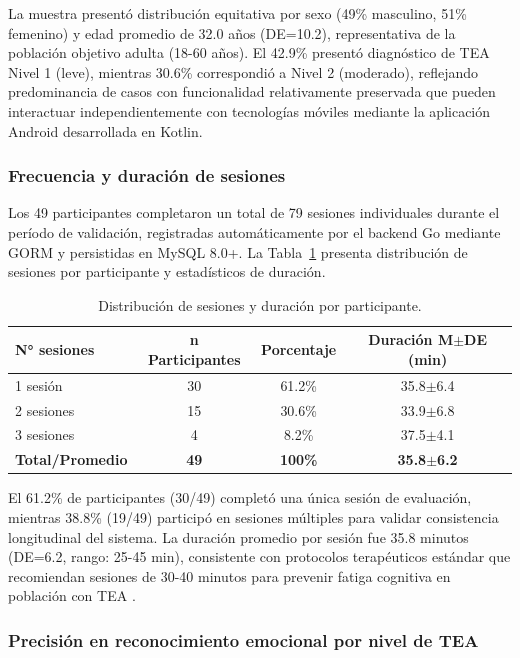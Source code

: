 \documentclass[journal,article,submit,pdftex,moreauthors]{Definitions/mdpi}
\begin{document}
	La muestra presentó distribución equitativa por sexo (49\% masculino, 51\% femenino) y edad promedio de 32.0 años (DE=10.2), representativa de la población objetivo adulta (18-60 años). El 42.9\% presentó diagnóstico de TEA Nivel 1 (leve), mientras 30.6\% correspondió a Nivel 2 (moderado), reflejando predominancia de casos con funcionalidad relativamente preservada que pueden interactuar independientemente con tecnologías móviles mediante la aplicación Android desarrollada en Kotlin.
	
	\subsubsection{Frecuencia y duración de sesiones}
	
	Los 49 participantes completaron un total de 79 sesiones individuales durante el período de validación, registradas automáticamente por el backend Go mediante GORM y persistidas en MySQL 8.0+. La Tabla~\ref{tab6} presenta distribución de sesiones por participante y estadísticos de duración.
	
	\begin{table}[H]
		\caption{Distribución de sesiones y duración por participante.\label{tab6}}
		\begin{tabularx}{\textwidth}{lccc}
			\toprule
			\textbf{N° sesiones} & \textbf{n Participantes} & \textbf{Porcentaje} & \textbf{Duración M$\pm$DE (min)} \\
			\midrule
			1 sesión & 30 & 61.2\% & 35.8$\pm$6.4 \\
			2 sesiones & 15 & 30.6\% & 33.9$\pm$6.8 \\
			3 sesiones & 4 & 8.2\% & 37.5$\pm$4.1 \\
			\textbf{Total/Promedio} & \textbf{49} & \textbf{100\%} & \textbf{35.8$\pm$6.2} \\
			\bottomrule
		\end{tabularx}
	\end{table}
	
	El 61.2\% de participantes (30/49) completó una única sesión de evaluación, mientras 38.8\% (19/49) participó en sesiones múltiples para validar consistencia longitudinal del sistema. La duración promedio por sesión fue 35.8 minutos (DE=6.2, rango: 25-45 min), consistente con protocolos terapéuticos estándar que recomiendan sesiones de 30-40 minutos para prevenir fatiga cognitiva en población con TEA \cite{ref24,ref26}.
	
	\subsubsection{Precisión en reconocimiento emocional por nivel de TEA}
	
\end{document}
